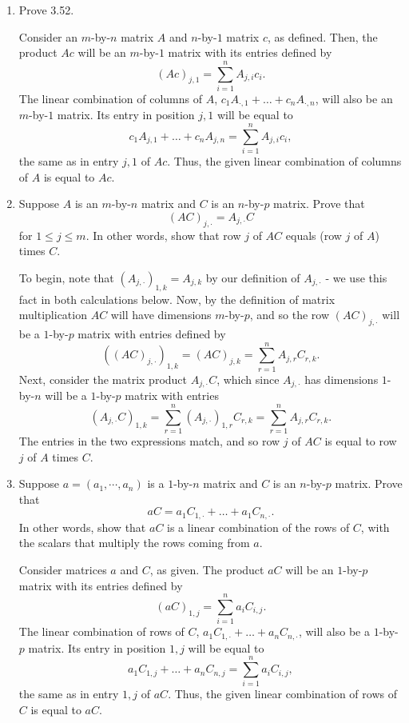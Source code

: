 \documentclass{book}
\begin{document}
\begin{enumerate}
\item Prove 3.52.

Consider an \(m\)-by-\(n\) matrix \(A\) and \(n\)-by-\(1\) matrix \(c\), as defined.  Then, the product \(Ac\) will be an \(m\)-by-\(1\) matrix with its entries defined by \[(Ac)_{j,1}=\sum_{i=1}^n A_{j,i} c_i.\] The linear combination of columns of \(A\), \(c_1A_{\cdot,1}+\dots+c_nA_{\cdot,n}\), will also be an \(m\)-by-\(1\) matrix.  Its entry in position \(j,1\) will be equal to \[c_1A_{j,1}+\dots+c_nA_{j,n}=\sum_{i=1}^n A_{j,i}c_i,\] the same as in entry \(j,1\) of \(Ac\).  Thus, the given linear combination of columns of \(A\) is equal to \(Ac\).

\item Suppose \(A\) is an \(m\)-by-\(n\) matrix and \(C\) is an \(n\)-by-\(p\) matrix.  Prove that \[(AC)_{j,\cdot}=A_{j,\cdot}C\] for \(1 \leq j \leq m\).  In other words, show that row \(j\) of \(AC\) equals (row \(j\) of \(A\)) times \(C\).

To begin, note that \((A_{j,\cdot})_{1,k}=A_{j,k}\) by our definition of \(A_{j,\cdot}\) - we use this fact in both calculations below.  Now, by the definition of matrix multiplication \(AC\) will have dimensions \(m\)-by-\(p\), and so the row \((AC)_{j,\cdot}\) will be a \(1\)-by-\(p\) matrix with entries defined by \[((AC)_{j,\cdot})_{1,k}=(AC)_{j,k}=\sum_{r=1}^n A_{j,r}C_{r,k}.\] Next, consider the matrix product \(A_{j,\cdot}C\), which since \(A_{j,\cdot}\) has dimensions \(1\)-by-\(n\) will be a \(1\)-by-\(p\) matrix with entries \[(A_{j,\cdot}C)_{1,k}=\sum_{r=1}^n (A_{j,\cdot})_{1,r}C_{r,k}=\sum_{r=1}^n A_{j,r}C_{r,k}.\] The entries in the two expressions match, and so row \(j\) of \(AC\) is equal to row \(j\) of \(A\) times \(C\).

\item Suppose \(a=(a_1,\cdots,a_n)\) is a \(1\)-by-\(n\) matrix and \(C\) is an \(n\)-by-\(p\) matrix.  Prove that \[aC=a_1C_{1,\cdot}+\dots+a_1C_{n,\cdot}.\] In other words, show that \(aC\) is a linear combination of the rows of \(C\), with the scalars that multiply the rows coming from \(a\).

Consider matrices \(a\) and \(C\), as given.  The product \(aC\) will be an \(1\)-by-\(p\) matrix with its entries defined by \[(aC)_{1,j}=\sum_{i=1}^n a_i C_{i,j}.\] The linear combination of rows of \(C\), \(a_1C_{1,\cdot}+\dots+a_nC_{n,\cdot}\), will also be a \(1\)-by-\(p\) matrix.  Its entry in position \(1,j\) will be equal to \[a_1C_{1,j}+\dots+a_nC_{n,j}=\sum_{i=1}^n a_iC_{i,j},\] the same as in entry \(1,j\) of \(aC\).  Thus, the given linear combination of rows of \(C\) is equal to \(aC\).


\end{enumerate}
\end{document}
